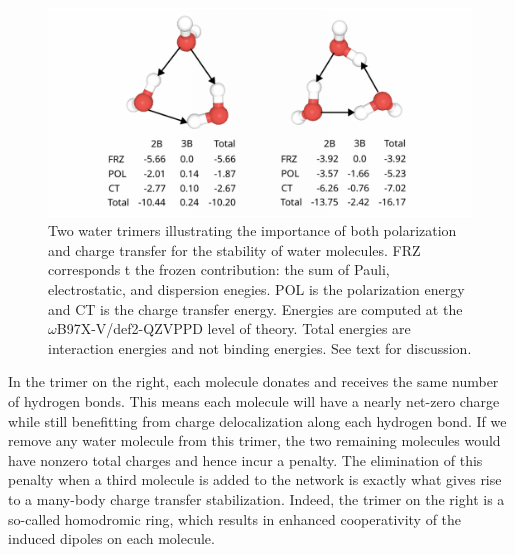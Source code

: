 \documentclass[journal=jctcce,manuscript=article]{achemso}
\begin{document}
\begin{figure}[H]
  \includegraphics*[width=\textwidth]{figures/trimer_mbe_example.png}
  \caption{Two water trimers illustrating the importance of both polarization
  and charge transfer for the stability of water molecules. FRZ corresponds t
  the frozen contribution: the sum of Pauli, electrostatic, and dispersion enegies. POL is the polarization
  energy and CT is the charge transfer energy. Energies are computed at the
  $\omega$B97X-V/def2-QZVPPD level of theory. Total energies are
  interaction energies and not binding energies. See text for discussion.}
  \label{fig:trimer}
\end{figure}

In the trimer on the right, each molecule donates and receives the same number of hydrogen bonds. This means each molecule will have a nearly net-zero charge while still benefitting from charge delocalization along each hydrogen bond. If we remove any water molecule from this trimer, the two remaining molecules would have nonzero total charges and hence incur a penalty. The elimination of this penalty when a third molecule is added to the network is exactly what gives rise to a many-body charge transfer stabilization.  Indeed, the trimer on the right is a so-called homodromic ring, which results in enhanced cooperativity of the induced dipoles on each molecule.\cite{xantheas2000cooperativity}
\end{document}
